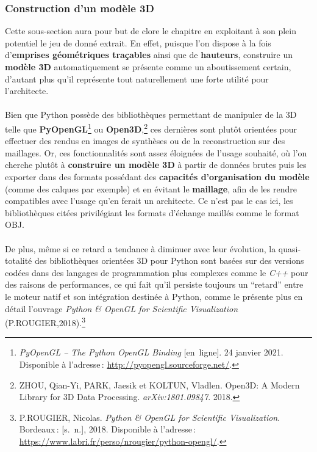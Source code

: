 \documentclass[
  11pt,
  french,
]{article}
\begin{document}
\hypertarget{construction-dun-moduxe8le-3d}{%
\subsubsection{Construction d'un modèle
3D}\label{construction-dun-moduxe8le-3d}}

Cette sous-section aura pour but de clore le chapitre en exploitant à
son plein potentiel le jeu de donné extrait. En effet, puisque l'on
dispose à la fois d'\textbf{emprises géométriques traçables} ainsi que
de \textbf{hauteurs}, construire un \textbf{modèle 3D} automatiquement
se présente comme un aboutissement certain, d'autant plus qu'il
représente tout naturellement une forte utilité pour l'architecte.\\
~\\
Bien que Python possède des bibliothèques permettant de manipuler de la
3D telle que \textbf{PyOpenGL}\footnote{\emph{PyOpenGL -- The Python
  OpenGL Binding} {[}en~ligne{]}. 24 janvier 2021. Disponible à
  l'adresse\,: \url{http://pyopengl.sourceforge.net/}.} ou
\textbf{Open3D},\footnote{ZHOU, Qian-Yi, PARK, Jaesik et KOLTUN,
  Vladlen. {Open3D}: {A} Modern Library for {3D} Data Processing.
  \emph{arXiv:1801.09847}. 2018.} ces dernières sont plutôt orientées
pour effectuer des rendus en images de synthèses ou de la reconstruction
sur des maillages. Or, ces fonctionnalités sont assez éloignées de
l'usage souhaité, où l'on cherche plutôt à \textbf{construire un modèle
3D} à partir de données brutes puis les exporter dans des formats
possédant des \textbf{capacités d'organisation du modèle} (comme des
calques par exemple) et en évitant le \textbf{maillage}, afin de les
rendre compatibles avec l'usage qu'en ferait un architecte. Ce n'est pas
le cas ici, les bibliothèques citées privilégiant les formats d'échange
maillés comme le format OBJ.\\
~\\
De plus, même si ce retard a tendance à diminuer avec leur évolution, la
quasi-totalité des bibliothèques orientées 3D pour Python sont basées
sur des versions codées dans des langages de programmation plus
complexes comme le \emph{C++} pour des raisons de performances, ce qui
fait qu'il persiste toujours un ``retard'' entre le moteur natif et son
intégration destinée à Python, comme le présente plus en détail
l'ouvrage \emph{Python \& OpenGL for Scientific Visualization}
(P.ROUGIER,2018).\footnote{P.ROUGIER, Nicolas. \emph{Python \& OpenGL
  for Scientific Visualization}. Bordeaux\,: {[}s.~n.{]}, 2018.
  Disponible à l'adresse\,:
  \url{https://www.labri.fr/perso/nrougier/python-opengl/}.}\\
\end{document}
